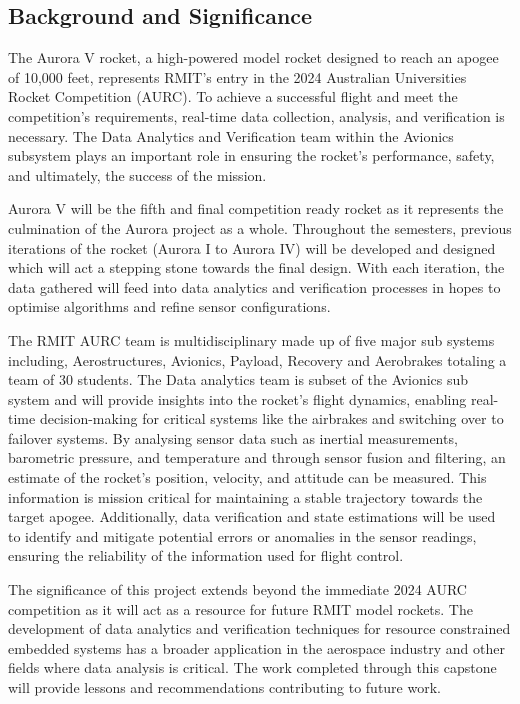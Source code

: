 \subsection{Background and Significance}
The Aurora V rocket, a high-powered model rocket designed to reach an apogee of 10,000 feet, represents RMIT's entry in the 2024 Australian Universities Rocket Competition (AURC). To achieve a successful flight and meet the competition's requirements, real-time data collection, analysis, and verification is necessary. The Data Analytics and Verification team within the Avionics subsystem plays an important role in ensuring the rocket's performance, safety, and ultimately, the success of the mission. 

Aurora V will be the fifth and final competition ready rocket as it represents the culmination of the Aurora project as a whole. Throughout the semesters, previous iterations of the rocket (Aurora I to Aurora IV) will be developed and designed which will act a stepping stone towards the final design. With each iteration, the data gathered will feed into data analytics and verification processes in hopes to optimise algorithms and refine sensor configurations.  

The RMIT AURC team is multidisciplinary made up of five major sub systems including, Aerostructures, Avionics, Payload, Recovery and Aerobrakes totaling a team of 30 students. The Data analytics team is subset of the Avionics sub system and will provide insights into the rocket's flight dynamics, enabling real-time decision-making for critical systems like the airbrakes and switching over to failover systems. By analysing sensor data such as inertial measurements, barometric pressure, and temperature and through sensor fusion and filtering, an estimate of the rocket's position, velocity, and attitude can be measured. This information is mission critical for maintaining a stable trajectory towards the target apogee. Additionally, data verification and state estimations will be used to identify and mitigate potential errors or anomalies in the sensor readings, ensuring the reliability of the information used for flight control. 

The significance of this project extends beyond the immediate 2024 AURC competition as it will act as a resource for future RMIT model rockets. The development of data analytics and verification techniques for resource constrained embedded systems has a broader application in the aerospace industry and other fields where data analysis is critical. The work completed through this capstone will provide lessons and recommendations contributing to future work.  


